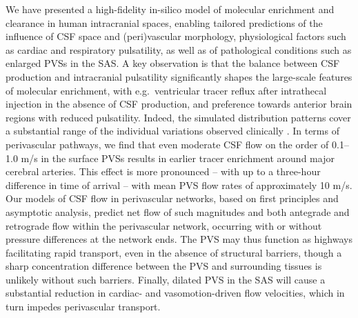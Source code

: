 \documentclass[fleqn,10pt]{wlscirep}
\begin{document}
We have presented a high-fidelity in-silico model of molecular
enrichment and clearance in human intracranial spaces, enabling
tailored predictions of the influence of CSF space and (peri)vascular
morphology, physiological factors such as cardiac and respiratory
pulsatility, as well as of pathological conditions such as enlarged
PVSs in the SAS. A key observation is that the balance between CSF
production and intracranial pulsatility significantly shapes the
large-scale features of molecular enrichment, with e.g.~ventricular
tracer reflux after intrathecal injection in the absence of CSF
production, and preference towards anterior brain regions with reduced
pulsatility. Indeed, the simulated distribution patterns cover a
substantial range of the individual variations observed clinically
\cite{ringstad2018brain}. In terms of perivascular pathways, we find
that even moderate CSF flow on the order of 0.1--1.0 \textmu m/s in
the surface PVSs results in earlier tracer enrichment around major
cerebral arteries. This effect is more pronounced -- with up to a
three-hour difference in time of arrival -- with mean PVS flow rates
of approximately 10 \textmu m/s. Our models of CSF flow in
perivascular networks, based on first principles and asymptotic
analysis, predict net flow of such magnitudes and both antegrade and
retrograde flow within the perivascular network, occurring with or
without pressure differences at the network ends. The PVS may thus
function as highways facilitating rapid transport, even in the absence
of structural barriers, though a sharp concentration difference
between the PVS and surrounding tissues is unlikely without such
barriers. Finally, dilated PVS in the SAS will cause a substantial reduction in
cardiac- and vasomotion-driven flow velocities, which in turn impedes
perivascular transport.

\end{document}
